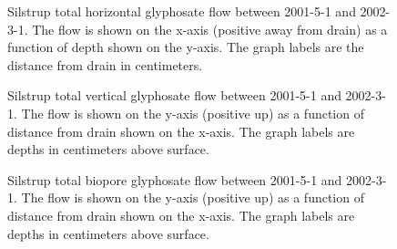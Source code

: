 \begin{figure}[htbp]
  \centering
  
  \caption{Silstrup total horizontal glyphosate flow between 2001-5-1 and
    2002-3-1.  The flow is shown on the x-axis (positive away from
    drain) as a function of depth shown on the y-axis.  The graph
    labels are the distance from drain in centimeters.}
  \label{fig:Silstrup-Glyphosate-2001-horizontal}
\end{figure}\FloatBarrier

\begin{figure}[htbp]
  \centering
  
  \caption{Silstrup total vertical glyphosate flow between 2001-5-1 and
    2002-3-1.  The flow is shown on the y-axis (positive up) as a
    function of distance from drain shown on the x-axis.  The graph
    labels are depths in centimeters above surface.}
  \label{fig:Silstrup-Glyphosate-2001-vertical}
\end{figure}\FloatBarrier

\begin{figure}[htbp]
  \centering
  
  \caption{Silstrup total biopore glyphosate flow between 2001-5-1 and
    2002-3-1.  The flow is shown on the y-axis (positive up) as a
    function of distance from drain shown on the x-axis.  The graph
    labels are depths in centimeters above surface.}
  \label{fig:Silstrup-Glyphosate-biopore-2001}
\end{figure}\FloatBarrier

